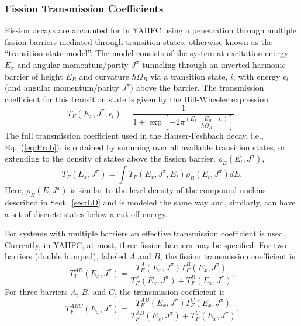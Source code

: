 \documentclass[
10pt,
showpacs,preprintnumbers,footinbib,
amsfonts,amsmath,amssymb,
aps,
prc,twocolumn,groupedaddress,superscriptaddress,
showkeys,
nofootinbib
]{revtex4-1}
\begin{document}
\subsubsection{Fission Transmission Coefficients}

Fission decays are accounted for in YAHFC using a penetration through multiple fission barriers mediated through transition states, otherwise known as the ``transition-state model''. The model consists of the system at excitation energy $E_x$ and angular momentum/parity $J^\pi$ tunneling  through an inverted harmonic barrier of height $E_B$ and curvature $\hbar\Omega_B$ via a transition state, $i$, with energy $\epsilon_i$ (and angular momentum/parity $J^\pi$) above the barrier. The transmission coefficient for this transition state is given by the Hill-Wheeler expression
\begin{equation}
T_F(E_x,J^\pi,\epsilon_i)  = \frac{1} { 1 + \exp\left [-2\pi\frac{(E_x - E_B - \epsilon_i) } {\hbar\Omega_B }\right ] }.
\end{equation}
The full transmission coefficient used in the Hauser-Feshbach decay, i.e., Eq.~(\ref{eq:Prob}), is obtained by summing over all available transition states, or extending to the density of states above the fission barrier, $\rho_B(E_t,J^\pi)$, 
\begin{equation}
T_F(E_x,J^\pi) = \int T_F(E_x,J^\pi,E_t) \rho_B(E_t,J^\pi)dE.
\end{equation}
Here, $\rho_B(E,J^\pi)$ is similar to the level density of the compound nucleus described in Sect.~\ref{sec:LD} and is modeled the same way and, similarly, can have a set of discrete states below a cut off energy. 

For systems with multiple barriers an effective transmission coefficient is used. Currently, in YAHFC, at most, three fission barriers may be specified. For two barriers (double humped), labeled $A$ and $B$, the fission transmission coefficient is
\begin{equation}
T_{F}^{AB}(E_x,J^\pi) = \frac{ T_{F}^{A}(E_x,J^\pi)T_{F}^{B}(E_x,J^\pi) } { T_{F}^{A}(E_x,J^\pi)+T_{F}^{B}(E_x,J^\pi)}.
\label{eq:Two-Barr}
\end{equation}
For three barriers $A$, $B$, and $C$, the transmission coefficient is
\begin{equation}
T_{F}^{ABC}(E_x,J^\pi) = \frac{ T_{F}^{AB}(E_x,J^\pi)T_{F}^{C}(E_x,J^\pi) } { T_{F}^{AB}(E_x,J^\pi)+T_{F}^{C}(E_x,J^\pi)}.
\end{equation}
\end{document}
